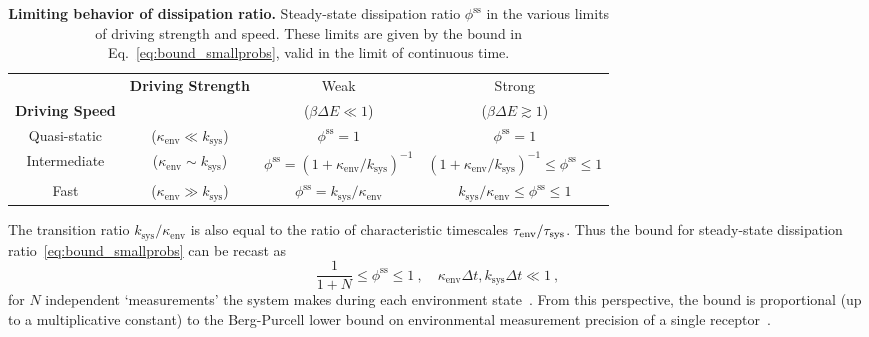 \documentclass[entropy,article,
submit,
moreauthors,pdftex,10pt,a4paper]{mdpi}
\newcommand{\phiSS}{\phi^{\mathrm{ss}}}
\newcommand{\kenv}{\kappa_\mathrm{env}}
\newcommand{\ksys}{k_\mathrm{sys}}
\begin{document}
\begin{table}[H]
    \caption{    \label{tab:bounds}
{\bf Limiting behavior of dissipation ratio.} Steady-state dissipation ratio $\phiSS$ in the various limits of driving strength and speed. These limits are given by the bound in Eq.~\eqref{eq:bound_smallprobs}, valid in the limit of continuous time.}
\centering
    \begin{tabular}{cc|c|c}
    ~             & \textbf{Driving Strength}     & Weak                        & Strong                                \\
    \textbf{Driving Speed} & ~                    & ($\beta\Delta E \ll 1$)     & ($\beta\Delta E \gtrsim 1$)        \\ \hline
    Quasi-static  & ($\kenv \ll \ksys$)  & $\phiSS=1$                    & $\phiSS=1$                              \\
    Intermediate & ($\kenv \sim \ksys$) & $\phiSS=(1+\kenv/\ksys)^{-1}$ & $(1+\kenv/\ksys)^{-1} \le \phiSS \le 1$ \\
    Fast          & ($\kenv \gg \ksys$)  & $\phiSS=\ksys/\kenv$           & $\ksys/\kenv \le \phiSS \le 1$          \\ \hline
    \end{tabular}
\end{table}

The transition ratio $\ksys/\kenv$ is also equal to the ratio of characteristic timescales $\tau_{\rm env}/\tau_{\rm sys}$. Thus the bound for steady-state dissipation ratio~\eqref{eq:bound_smallprobs} can be recast as 
\begin{equation}
\frac{1}{1+N} \le \phiSS \le 1 \ , \quad 
    \kenv\Delta t, \ksys\Delta t\ll 1 \ ,
\end{equation}
for $N$ independent `measurements' the system makes during each environment state~\cite{Govern:2014ez}.  From this perspective, the bound is proportional (up to a multiplicative constant) to the Berg-Purcell lower bound on environmental measurement precision of a single receptor~\cite{Berg:1977bp}.  
\end{document}

